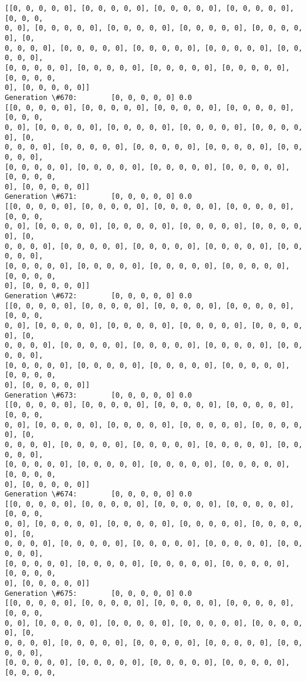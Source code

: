 \documentclass[11pt]{article}
\begin{document}
\begin{Verbatim}[commandchars=\\\{\}]
[[0, 0, 0, 0, 0], [0, 0, 0, 0, 0], [0, 0, 0, 0, 0], [0, 0, 0, 0, 0], [0, 0, 0,
0, 0], [0, 0, 0, 0, 0], [0, 0, 0, 0, 0], [0, 0, 0, 0, 0], [0, 0, 0, 0, 0], [0,
0, 0, 0, 0], [0, 0, 0, 0, 0], [0, 0, 0, 0, 0], [0, 0, 0, 0, 0], [0, 0, 0, 0, 0],
[0, 0, 0, 0, 0], [0, 0, 0, 0, 0], [0, 0, 0, 0, 0], [0, 0, 0, 0, 0], [0, 0, 0, 0,
0], [0, 0, 0, 0, 0]]
Generation \#670:        [0, 0, 0, 0, 0] 0.0
[[0, 0, 0, 0, 0], [0, 0, 0, 0, 0], [0, 0, 0, 0, 0], [0, 0, 0, 0, 0], [0, 0, 0,
0, 0], [0, 0, 0, 0, 0], [0, 0, 0, 0, 0], [0, 0, 0, 0, 0], [0, 0, 0, 0, 0], [0,
0, 0, 0, 0], [0, 0, 0, 0, 0], [0, 0, 0, 0, 0], [0, 0, 0, 0, 0], [0, 0, 0, 0, 0],
[0, 0, 0, 0, 0], [0, 0, 0, 0, 0], [0, 0, 0, 0, 0], [0, 0, 0, 0, 0], [0, 0, 0, 0,
0], [0, 0, 0, 0, 0]]
Generation \#671:        [0, 0, 0, 0, 0] 0.0
[[0, 0, 0, 0, 0], [0, 0, 0, 0, 0], [0, 0, 0, 0, 0], [0, 0, 0, 0, 0], [0, 0, 0,
0, 0], [0, 0, 0, 0, 0], [0, 0, 0, 0, 0], [0, 0, 0, 0, 0], [0, 0, 0, 0, 0], [0,
0, 0, 0, 0], [0, 0, 0, 0, 0], [0, 0, 0, 0, 0], [0, 0, 0, 0, 0], [0, 0, 0, 0, 0],
[0, 0, 0, 0, 0], [0, 0, 0, 0, 0], [0, 0, 0, 0, 0], [0, 0, 0, 0, 0], [0, 0, 0, 0,
0], [0, 0, 0, 0, 0]]
Generation \#672:        [0, 0, 0, 0, 0] 0.0
[[0, 0, 0, 0, 0], [0, 0, 0, 0, 0], [0, 0, 0, 0, 0], [0, 0, 0, 0, 0], [0, 0, 0,
0, 0], [0, 0, 0, 0, 0], [0, 0, 0, 0, 0], [0, 0, 0, 0, 0], [0, 0, 0, 0, 0], [0,
0, 0, 0, 0], [0, 0, 0, 0, 0], [0, 0, 0, 0, 0], [0, 0, 0, 0, 0], [0, 0, 0, 0, 0],
[0, 0, 0, 0, 0], [0, 0, 0, 0, 0], [0, 0, 0, 0, 0], [0, 0, 0, 0, 0], [0, 0, 0, 0,
0], [0, 0, 0, 0, 0]]
Generation \#673:        [0, 0, 0, 0, 0] 0.0
[[0, 0, 0, 0, 0], [0, 0, 0, 0, 0], [0, 0, 0, 0, 0], [0, 0, 0, 0, 0], [0, 0, 0,
0, 0], [0, 0, 0, 0, 0], [0, 0, 0, 0, 0], [0, 0, 0, 0, 0], [0, 0, 0, 0, 0], [0,
0, 0, 0, 0], [0, 0, 0, 0, 0], [0, 0, 0, 0, 0], [0, 0, 0, 0, 0], [0, 0, 0, 0, 0],
[0, 0, 0, 0, 0], [0, 0, 0, 0, 0], [0, 0, 0, 0, 0], [0, 0, 0, 0, 0], [0, 0, 0, 0,
0], [0, 0, 0, 0, 0]]
Generation \#674:        [0, 0, 0, 0, 0] 0.0
[[0, 0, 0, 0, 0], [0, 0, 0, 0, 0], [0, 0, 0, 0, 0], [0, 0, 0, 0, 0], [0, 0, 0,
0, 0], [0, 0, 0, 0, 0], [0, 0, 0, 0, 0], [0, 0, 0, 0, 0], [0, 0, 0, 0, 0], [0,
0, 0, 0, 0], [0, 0, 0, 0, 0], [0, 0, 0, 0, 0], [0, 0, 0, 0, 0], [0, 0, 0, 0, 0],
[0, 0, 0, 0, 0], [0, 0, 0, 0, 0], [0, 0, 0, 0, 0], [0, 0, 0, 0, 0], [0, 0, 0, 0,
0], [0, 0, 0, 0, 0]]
Generation \#675:        [0, 0, 0, 0, 0] 0.0
[[0, 0, 0, 0, 0], [0, 0, 0, 0, 0], [0, 0, 0, 0, 0], [0, 0, 0, 0, 0], [0, 0, 0,
0, 0], [0, 0, 0, 0, 0], [0, 0, 0, 0, 0], [0, 0, 0, 0, 0], [0, 0, 0, 0, 0], [0,
0, 0, 0, 0], [0, 0, 0, 0, 0], [0, 0, 0, 0, 0], [0, 0, 0, 0, 0], [0, 0, 0, 0, 0],
[0, 0, 0, 0, 0], [0, 0, 0, 0, 0], [0, 0, 0, 0, 0], [0, 0, 0, 0, 0], [0, 0, 0, 0,

\end{Verbatim}
\end{document}
